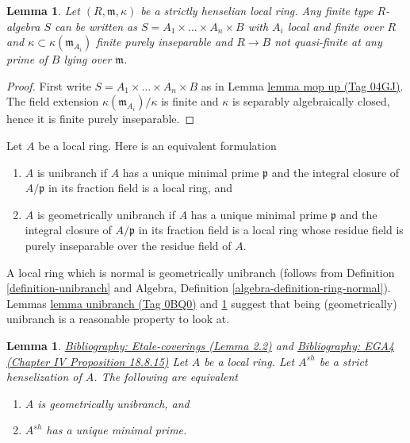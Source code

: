 \documentclass{amsart}
\newenvironment{reference}{\comment}{\endcomment}
\theoremstyle{plain}
\newtheorem{lemma}[subsection]{Lemma}
\theoremstyle{definition}
\theoremstyle{remark}
\numberwithin{equation}{subsection}
\begin{document}
\begin{lemma}
\label{algebra-lemma-mop-up-strictly-henselian}
Let $(R, \mathfrak m, \kappa)$ be a strictly henselian local ring.
Any finite type $R$-algebra $S$ can be written as
$S = A_1 \times \ldots \times A_n \times B$ with $A_i$ local
and finite over $R$ and $\kappa \subset \kappa(\mathfrak m_{A_i})$
finite purely inseparable and $R \to B$ not quasi-finite
at any prime of $B$ lying over $\mathfrak m$.
\end{lemma}

\begin{proof}
First write $S = A_1 \times \ldots \times A_n \times B$ as in
Lemma \href{https://stacks.math.columbia.edu/tag/04GJ}{lemma mop up (Tag 04GJ)}.
The field extension $\kappa(\mathfrak m_{A_i})/\kappa$
is finite and $\kappa$ is separably algebraically closed, hence
it is finite purely inseparable.
\end{proof}


\noindent
Let $A$ be a local ring. Here is an equivalent formulation
\begin{enumerate}
\item $A$ is unibranch if $A$ has a unique minimal prime $\mathfrak p$ and
the integral closure of $A/\mathfrak p$ in its fraction field is a
local ring, and
\item $A$ is geometrically unibranch if $A$ has a unique minimal prime
$\mathfrak p$ and the integral closure of $A/\mathfrak p$ in its
fraction field is a local ring whose residue field is purely inseparable
over the residue field of $A$.
\end{enumerate}
A local ring which is normal is geometrically unibranch
(follows from Definition \ref{definition-unibranch} and
Algebra, Definition \ref{algebra-definition-ring-normal}).
Lemmas \href{https://stacks.math.columbia.edu/tag/0BQ0}{lemma unibranch (Tag 0BQ0)} and \ref{lemma-geometrically-unibranch}
suggest that being (geometrically) unibranch
is a reasonable property to look at.


\begin{lemma}
\label{lemma-geometrically-unibranch}
\begin{reference}
\href{https://stacks.math.columbia.edu/bibliography}{Bibliography: Etale-coverings (Lemma 2.2)} and
\href{https://stacks.math.columbia.edu/bibliography}{Bibliography: EGA4 (Chapter IV Proposition 18.8.15)}
\end{reference}
Let $A$ be a local ring. Let $A^{sh}$ be a strict henselization of $A$.
The following are equivalent
\begin{enumerate}
\item $A$ is geometrically unibranch, and
\item $A^{sh}$ has a unique minimal prime.
\end{enumerate}
\end{lemma}
\end{document}
